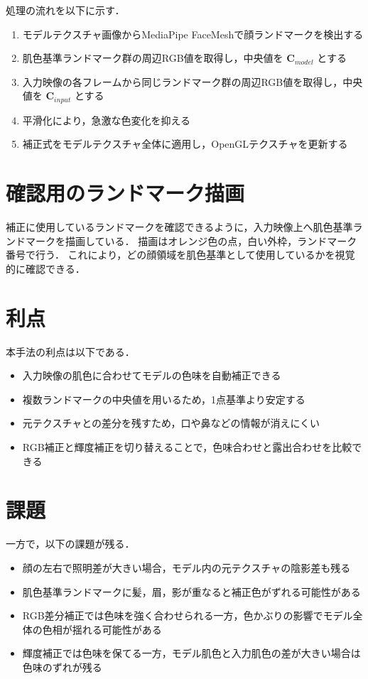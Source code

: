 \documentclass[uplatex,dvipdfmx]{jsarticle}
\begin{document}
処理の流れを以下に示す．

\begin{enumerate}
  \item モデルテクスチャ画像からMediaPipe FaceMeshで顔ランドマークを検出する
  \item 肌色基準ランドマーク群の周辺RGB値を取得し，中央値を $\mathbf{C}_{model}$ とする
  \item 入力映像の各フレームから同じランドマーク群の周辺RGB値を取得し，中央値を $\mathbf{C}_{input}$ とする
  \item 平滑化により，急激な色変化を抑える
  \item 補正式をモデルテクスチャ全体に適用し，OpenGLテクスチャを更新する
\end{enumerate}

\section{確認用のランドマーク描画}

補正に使用しているランドマークを確認できるように，入力映像上へ肌色基準ランドマークを描画している．
描画はオレンジ色の点，白い外枠，ランドマーク番号で行う．
これにより，どの顔領域を肌色基準として使用しているかを視覚的に確認できる．

\section{利点}

本手法の利点は以下である．

\begin{itemize}
  \item 入力映像の肌色に合わせてモデルの色味を自動補正できる
  \item 複数ランドマークの中央値を用いるため，1点基準より安定する
  \item 元テクスチャとの差分を残すため，口や鼻などの情報が消えにくい
  \item RGB補正と輝度補正を切り替えることで，色味合わせと露出合わせを比較できる
\end{itemize}

\section{課題}

一方で，以下の課題が残る．

\begin{itemize}
  \item 顔の左右で照明差が大きい場合，モデル内の元テクスチャの陰影差も残る
  \item 肌色基準ランドマークに髪，眉，影が重なると補正色がずれる可能性がある
  \item RGB差分補正では色味を強く合わせられる一方，色かぶりの影響でモデル全体の色相が揺れる可能性がある
  \item 輝度補正では色味を保てる一方，モデル肌色と入力肌色の差が大きい場合は色味のずれが残る
\end{itemize}
\end{document}
